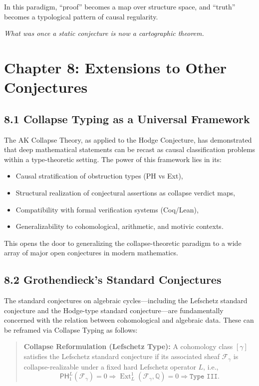 \documentclass[11pt]{article}
\DeclareMathOperator{\Ext}{Ext}
\begin{document}
In this paradigm, “proof” becomes a map over structure space, and “truth” becomes a typological pattern of causal regularity.

\begin{center}
\textit{What was once a static conjecture is now a cartographic theorem.}
\end{center}



\section{Chapter 8: Extensions to Other Conjectures}

\subsection{8.1 Collapse Typing as a Universal Framework}

The AK Collapse Theory, as applied to the Hodge Conjecture, has demonstrated that deep mathematical statements can be recast as causal classification problems within a type-theoretic setting. The power of this framework lies in its:

\begin{itemize}
  \item Causal stratification of obstruction types (PH vs Ext),
  \item Structural realization of conjectural assertions as collapse verdict maps,
  \item Compatibility with formal verification systems (Coq/Lean),
  \item Generalizability to cohomological, arithmetic, and motivic contexts.
\end{itemize}

This opens the door to generalizing the collapse-theoretic paradigm to a wide array of major open conjectures in modern mathematics.

\subsection{8.2 Grothendieck’s Standard Conjectures}

The standard conjectures on algebraic cycles—including the Lefschetz standard conjecture and the Hodge-type standard conjecture—are fundamentally concerned with the relation between cohomological and algebraic data. These can be reframed via Collapse Typing as follows:

\begin{quote}
\textbf{Collapse Reformulation (Lefschetz Type):}  
A cohomology class $[\gamma]$ satisfies the Lefschetz standard conjecture if its associated sheaf $\mathcal{F}_\gamma$ is collapse-realizable under a fixed hard Lefschetz operator $L$, i.e.,
\[
\mathsf{PH}_1^L(\mathcal{F}_\gamma) = 0 \Rightarrow \Ext^1_L(\mathcal{F}_\gamma, \mathbb{Q}) = 0
\Rightarrow \texttt{Type III}.
\]
\end{quote}
\end{document}
